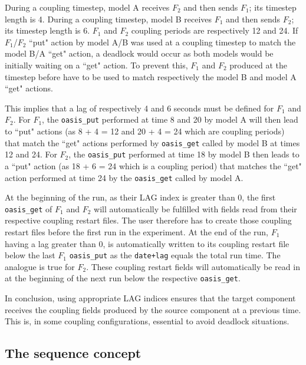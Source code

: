   During a coupling timestep, model A receives $F_2$ and then sends
  $F_1$; its timestep length is 4. During a coupling timestep, model B
  receives $F_1$ and then sends $F_2$; its timestep length is 6.
  $F_1$ and $F_2$ coupling periods are respectively 12 and 24. If
  $F_1$/$F_2$ ``put" action by model A/B was used at a coupling
  timestep to match the model B/A ``get" action, a deadlock would
  occur as both models would be initially waiting on a ``get"
  action. To prevent this, $F_1$ and $F_2$ produced at the timestep
  before have to be used to match respectively the model B and model A
  ``get" actions.

  This implies that a lag of respectively 4 and 6 seconds must be
  defined for $F_1$ and $F_2$. For $F_1$, the {\tt oasis\_put}
  performed at time 8 and 20 by model A will then lead to ``put"
  actions (as 8 + 4 = 12 and 20 + 4 = 24 which are coupling periods)
  that match the ``get" actions performed by {\tt oasis\_get} called by model B
  at times 12 and 24.  For $F_2$, the {\tt oasis\_put}
  performed at time 18 by model B then leads to a ``put" action (as 18
  + 6 = 24 which is a coupling period) that matches the ``get" action
  performed at time 24 by the {\tt oasis\_get} called by model A.

  At the beginning of the run, as their LAG index is greater than 0,
  the first {\tt oasis\_get} of $F_1$ and $F_2$ will automatically be
  fulfilled with fields read from their respective coupling restart
  files. The user therefore has to create those coupling restart files
  before the first run in the experiment. At the end of the run, $F_1$
  having a lag greater than 0, is automatically written to its
  coupling restart file below the last $F_1$ {\tt oasis\_put} as the
  {\tt date+lag} equals the total run time. The analogue is true for
  $F_2$. These coupling restart fields will automatically be read in at the beginning
  of the next run below the respective {\tt oasis\_get}.

  In conclusion, using appropriate LAG indices ensures that 
 the target component receives the coupling fields produced by the
  source component at a previous time. This is, in some coupling
  configurations, essential to avoid deadlock situations.

\vspace{-0.3cm}
\subsection{The sequence concept}
\label{subsec_sec}

